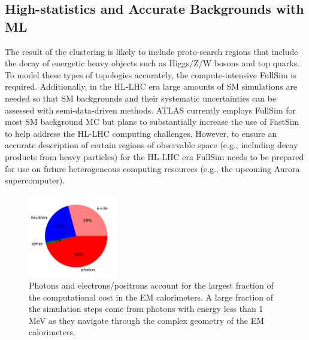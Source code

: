 \documentclass[letter, USenglish, 11pt, subfigure]{article}
\begin{document}
\subsection{High-statistics and Accurate Backgrounds with ML}
The result of the clustering is likely to include proto-search regions that include the decay of energetic heavy objects such as Higgs/Z/W bosons and top quarks. To model these types of topologies accurately, the compute-intensive FullSim is required. Additionally, in the HL-LHC era large amounts of SM simulations are needed so that SM backgrounds and their systematic uncertainties can be assessed with semi-data-driven methods. ATLAS currently employs FullSim for most SM background MC but plans to substantially increase the use of FastSim to help address the HL-LHC computing challenges. However, to ensure an accurate description of certain regions of observable space (e.g., including decay products from heavy particles) for the HL-LHC era FullSim needs to be prepared for use on future heterogeneous computing resources (e.g., the upcoming Aurora supercomputer).


\begin{figure}
  \centering
  \includegraphics[width=0.35\textwidth]{figures/particleCostEMBPlusEMEC.pdf}
  \caption{\label{fig:compCostPie} Photons and electrons/positrons account for the largest fraction of the computational cost in the EM calorimeters. A large fraction of the simulation steps come from photons with energy less than 1 MeV as they navigate through the complex geometry of the EM calorimeters.}
\end{figure}
\end{document}
